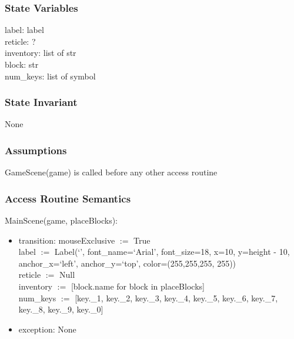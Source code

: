 \documentclass{article}
\begin{document}
\subsubsection {State Variables}
label: label \\
reticle: ?\\
inventory: list of str \\
block: str \\
num\_keys: list of symbol

\subsubsection {State Invariant}
None

\subsubsection {Assumptions}
GameScene(game) is called before any other access routine

\subsubsection {Access Routine Semantics}
\noindent MainScene(game, placeBlocks):
\begin{itemize}
\item transition: mouseExclusive $:=$ True\\
    label $:=$ Label(`', font\_name=`Arial', font\_size=18,
            x=10, y=height - 10, anchor\_x=`left', anchor\_y=`top',
            color=(255,255,255, 255))\\
    reticle $:=$ Null\\
    inventory $:=$ [block.name for block in placeBlocks]\\
    num\_keys $:=$ [key.\_1, key.\_2, key.\_3, key.\_4, key.\_5,
            key.\_6, key.\_7, key.\_8, key.\_9, key.\_0]
\item exception: None
\end{itemize}\vspace{6mm}
\end{document}
